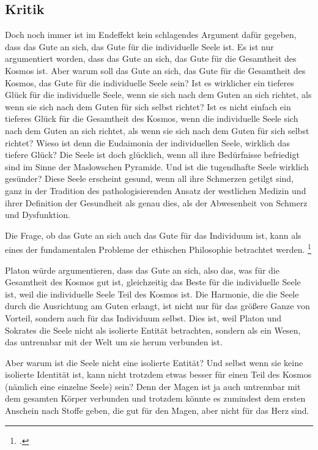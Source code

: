 \documentclass[12pt,a4paper]{article}
\begin{document}
\subsection[short]{Kritik}
Doch noch immer ist im Endeffekt kein schlagendes Argument dafür gegeben, dass das Gute an sich, das Gute für die individuelle Seele ist. Es ist nur argumentiert worden, dass das Gute an sich, das Gute für die Gesamtheit des Kosmos ist. Aber warum soll das Gute an sich, das Gute für die Gesamtheit des Kosmos, das Gute für die individuelle Seele sein? Ist es wirklicher ein tieferes Glück für die individuelle Seele, wenn sie sich nach dem Guten an sich richtet, als wenn sie sich nach dem Guten für sich selbst richtet? Ist es nicht einfach ein tieferes Glück für die Gesamtheit des Kosmos, wenn die individuelle Seele sich nach dem Guten an sich richtet, als wenn sie sich nach dem Guten für sich selbst richtet? Wieso ist denn die Eudaimonia der individuellen Seele, wirklich das tiefere Glück? Die Seele ist doch glücklich, wenn all ihre Bedürfnisse befriedigt sind im Sinne der Maslowschen Pyramide. Und ist die tugendhafte Seele wirklich gesünder? Diese Seele erscheint gesund, wenn all ihre Schmerzen getilgt sind, ganz in der Tradition des pathologisierenden Ansatz der westlichen Medizin und ihrer Definition der Gesundheit als genau dies, als der Abwesenheit von Schmerz und Dysfunktion.

Die Frage, ob das Gute an sich auch das Gute für das Individuum ist, kann als eines der fundamentalen Probleme der ethischen Philosophie betrachtet werden. \footcite{maslow1987}

Platon würde argumentieren, dass das Gute an sich, also das, was für die Gesamtheit des Kosmos gut ist, gleichzeitig das Beste für die individuelle Seele ist, weil die individuelle Seele Teil des Kosmos ist. Die Harmonie, die die Seele durch die Ausrichtung am Guten erlangt, ist nicht nur für das größere Ganze von Vorteil, sondern auch für das Individuum selbst. Dies ist, weil Platon und Sokrates die Seele nicht als isolierte Entität betrachten, sondern als ein Wesen, das untrennbar mit der Welt um sie herum verbunden ist. 

Aber warum ist die Seele nicht eine isolierte Entität? Und selbst wenn sie keine isolierte Identität ist, kann nicht trotzdem etwas besser für einen Teil des Kosmos (nämlich eine einzelne Seele) sein? Denn der Magen ist ja auch untrennbar mit dem gesamten Körper verbunden und trotzdem könnte es zumindest dem ersten Anschein nach Stoffe geben, die gut für den Magen, aber nicht für das Herz sind.
\end{document}
